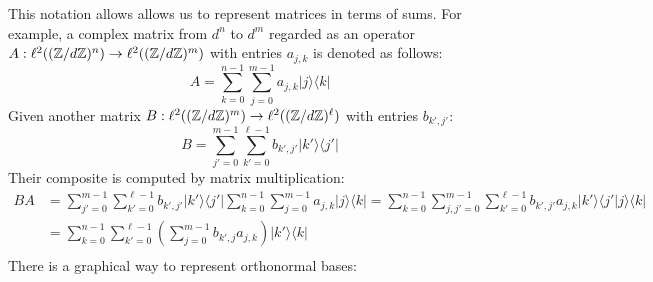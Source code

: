 This notation allows allows us to represent matrices in terms of sums.  For example, a complex matrix from $d^n$ to $d^m$ regarded as an operator $A:\ell^2((\mathbb{Z}/d\mathbb{Z})^n)\to \ell^2((\mathbb{Z}/d\mathbb{Z})^m)$ with entries $a_{j,k}$ is denoted as follows:
$$
A  = \sum_{k=0}^{n-1} \sum_{j=0}^{m-1} a_{j,k}| j \rangle \langle k |
$$
Given another matrix $B:\ell^2((\mathbb{Z}/d\mathbb{Z})^m)\to \ell^2((\mathbb{Z}/d\mathbb{Z})^\ell)$ with entries $b_{k',j'}$:
$$
B  = \sum_{j'=0}^{m-1}\sum_{k'=0}^{\ell-1}  b_{k',j'}| k' \rangle \langle j' |
$$
Their composite is computed by matrix multiplication:
\begin{align*}
BA
  &=  \sum_{j'=0}^{m-1}\sum_{k'=0}^{\ell-1}  b_{k',j'}| k' \rangle \langle j' | \sum_{k=0}^{n-1} \sum_{j=0}^{m-1} a_{j,k}| j \rangle \langle k |
= \sum_{k=0}^{n-1} \sum_{j,j'=0}^{m-1}\sum_{k'=0}^{\ell-1}  b_{k',j'}a_{j,k}| k' \rangle \langle j' | j \rangle \langle k |\\
&= \sum_{k=0}^{n-1} \sum_{k'=0}^{\ell-1} \left(\sum_{j=0}^{m-1} b_{k',j}a_{j,k}\right)| k' \rangle \langle k |\\
\end{align*}
There is a graphical way to represent orthonormal bases:
